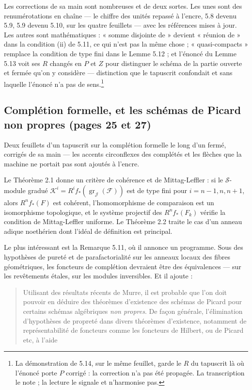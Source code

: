 \documentclass[11pt,a4paper]{article}
\begin{document}
Les corrections de sa main sont nombreuses et de deux sortes. Les unes sont des
renumérotations en chaîne — le chiffre des unités repassé à l'encre, 5.8 devenu
5.9, 5.9 devenu 5.10, sur les quatre feuillets — avec les références mises à
jour. Les autres sont mathématiques : « somme disjointe de » devient « réunion
de » dans la condition (ii) de 5.11, ce qui n'est pas la même chose ;
« quasi-compacts » remplace la condition de type fini dans le Lemme 5.12 ; et
l'énoncé du Lemme 5.13 voit ses $R$ changés en $P$ et $Z$ pour distinguer le
schéma de la partie ouverte et fermée qu'on y considère — distinction que le
tapuscrit confondait et sans laquelle l'énoncé n'a pas de sens.\footnote{La
démonstration de 5.14, sur le même feuillet, garde le $R$ du tapuscrit là où
l'énoncé porte $P$ corrigé : la correction n'a pas été propagée. La
transcription le note ; la lecture le signale et n'harmonise pas.}

\subsection*{Complétion formelle, et les schémas de Picard non propres (pages 25 et 27)}

Deux feuillets d'un tapuscrit sur la complétion formelle le long d'un fermé,
corrigés de sa main — les accents circonflexes des complétés et les flèches que
la machine ne portait pas sont ajoutés à l'encre.

Le Théorème 2.1 donne un critère de cohérence et de Mittag-Leffler : si le
$\mathcal{S}$-module gradué $\mathcal{K}^i = R^i f_{*}(\operatorname{gr}_
{\mathcal{J}}(\mathcal{F}))$ est de type fini pour $i = n-1, n, n+1$, alors
$R^n f_{*}(F)$ est cohérent, l'homomorphisme de comparaison est un isomorphisme
topologique, et le système projectif des $R^n f_{*}(F_k)$ vérifie la condition
de Mittag-Leffler uniforme. Le Théorème 2.2 traite le cas d'un anneau adique
noethérien dont l'idéal de définition est principal.

Le plus intéressant est la Remarque 5.11, où il annonce un programme. Sous des
hypothèses de pureté et de parafactorialité sur les anneaux locaux des fibres
géométriques, les foncteurs de complétion devraient être des équivalences — sur
les revêtements étales, sur les modules inversibles. Et il ajoute :

\begin{quote}
Utilisant des résultats récents de Murre, il est probable que l'on doit
pouvoir en déduire des théorèmes d'existence des schémas de Picard pour certains
schémas algébriques \emph{non propres}. De façon générale, l'élimination
d'hypothèses de propreté dans divers théorèmes d'existence, notamment de
représentabilité de foncteurs comme les foncteurs de Hilbert, ou de Picard etc,
à l'aide
\end{quote}
\end{document}
